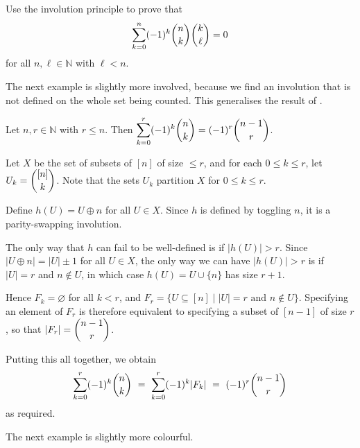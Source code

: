 \begin{exercise}
Use the involution principle to prove that
\[ \sum_{k=0}^n (-1)^k \dbinom{n}{k} \dbinom{k}{\ell} = 0 \]
for all $n,\ell \in \mathbb{N}$ with $\ell < n$.
\end{exercise}

The next example is slightly more involved, because we find an involution that is not defined on the whole set being counted. This generalises the result of .

\begin{proposition}
Let $n,r \in \mathbb{N}$ with $r \le n$. Then $\displaystyle \sum_{k=0}^r (-1)^k \dbinom{n}{k} = (-1)^r \dbinom{n-1}{r}$.
\end{proposition}

\begin{cproof}
Let $X$ be the set of subsets of $[n]$ of size $\le r$, and for each $0 \le k \le r$, let $U_k = \dbinom{[n]}{k}$. Note that the sets $U_k$ partition $X$ for $0 \le k \le r$.

Define $h(U) = U \oplus n$ for all $U \in X$. Since $h$ is defined by toggling $n$, it is a parity-swapping involution.

The only way that $h$ can fail to be well-defined is if $|h(U)| > r$. Since $|U \oplus n| = |U| \pm 1$ for all $U \in X$, the only way we can have $|h(U)| > r$ is if $|U| = r$ and $n \not\in U$, in which case $h(U) = U \cup \{ n \}$ has size $r+1$.

Hence $F_k = \varnothing$ for all $k<r$, and $F_r = \{ U \subseteq [n] \mid |U| = r \text{ and } n \not\in U \}$. Specifying an element of $F_r$ is therefore equivalent to specifying a subset of $[n-1]$ of size $r$, so that $|F_r| = \dbinom{n-1}{r}$.

Putting this all together, we obtain
\[ \sum_{k=0}^r (-1)^k \dbinom{n}{k} ~=~ \sum_{k=0}^r (-1)^k |F_k| ~=~ (-1)^r \dbinom{n-1}{r} \]
as required.
\end{cproof}

The next example is slightly more colourful.

